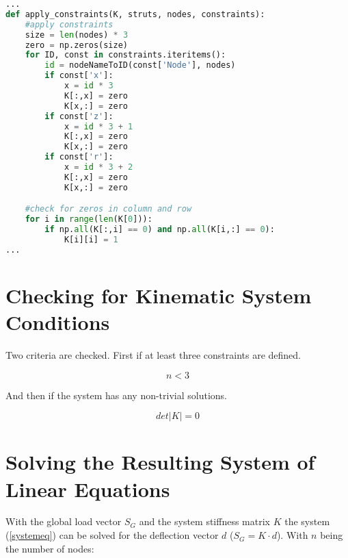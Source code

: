 \begin{inconsolata}
\begin{minipage}{\linewidth}
\begin{lstlisting}[language=python]
...
def apply_constraints(K, struts, nodes, constraints):
    #apply constraints
    size = len(nodes) * 3
    zero = np.zeros(size)
    for ID, const in constraints.iteritems():
        id = nodeNameToID(const['Node'], nodes)
        if const['x']:
            x = id * 3
            K[:,x] = zero
            K[x,:] = zero
        if const['z']:
            x = id * 3 + 1
            K[:,x] = zero
            K[x,:] = zero
        if const['r']:
            x = id * 3 + 2
            K[:,x] = zero
            K[x,:] = zero

    #check for zeros in column and row
    for i in range(len(K[0])):
        if np.all(K[:,i] == 0) and np.all(K[i,:] == 0):
            K[i][i] = 1
...
\end{lstlisting}
\end{minipage}
\end{inconsolata}

\section{Checking for Kinematic System Conditions}
\label{sec:kinesyscheck}

Two criteria are checked. First if at least three constraints are defined.

\begin{equation}
n < 3
\end{equation}

And then if the system has any non-trivial solutions.

\begin{equation}
det \lvert K \lvert = 0
\end{equation}

\pagebreak

\section{Solving the Resulting System of Linear Equations}
\label{sec:solver}

With the global load vector $S_G$ and the system stiffness matrix $K$ the system (\cref{systemeq}) can be solved for the deflection vector $d$ ($S_G = K \cdot d$).
With $n$ being the number of nodes:

